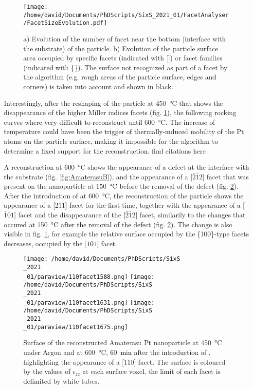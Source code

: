 \begin{figure}[!htb]
    \centering
    \texttt{[image: /home/david/Documents/PhDScripts/SixS\_2021\_01/FacetAnalyser/FacetSizeEvolution.pdf]}
    \caption{
        a) Evolution of the number of facet near the bottom (interface with the substrate) of the particle.
        b) Evolution of the particle surface area occupied by specific facets (indicated with []) or facet families (indicated with \{\}).
        The surface not recognized as part of a facet by the algorithm (e.g. rough areas of the particle surface, edges and corners) is taken into account and shown in black.
    }
    \label{fig:AmaterasuFacetsEvolution}
\end{figure}

Interestingly, after the reshaping of the particle at \qty{450}{\degreeCelsius} that shows the disappearance of the higher Miller indices facets (fig. \ref{fig:AmaterasuFacetsEvolution}), the following rocking curves where very difficult to reconstruct until \qty{600}{\degreeCelsius}.
The increase of temperature could have been the trigger of thermally-induced mobility of the Pt atoms on the particle surface, making it impossible for the algorithm to determine a fixed support for the reconstruction.
\textcolor{Important}{find citations here}

A reconstruction at \qty{600}{\degreeCelsius} shows the appearance of a defect at the interface with the substrate (fig. \ref{fig:AmaterasuB}), and the appearance of a [$\bar{2}\bar{1}2$] facet that was present on the nanoparticle at \qty{150}{\degreeCelsius} before the removal of the defect (fig. \ref{fig:Amaterasu110}).
After the introduction of \ammonia at \qty{600}{\degreeCelsius}, the reconstruction of the particle shows the appearance of a [2$\bar{1}\bar{1}$] facet for the first time, together with the appearance of a [$\bar{1}01$] facet and the disappearance of the [$\bar{2}\bar{1}2$] facet, similarily to the changes that occured at \qty{150}{\degreeCelsius} after the removal of the defect (fig. \ref{fig:Amaterasu110}).
The change is also visible in fig. \ref{fig:AmaterasuFacetsEvolution}, for example the relative surface occupied by the \{100\}-type facets decreases, occupied by the [$\bar{1}01$] facet.

\begin{figure}[!htb]
    \centering
    \texttt{[image: /home/david/Documents/PhDScripts/SixS\\\_2021\\\_01/paraview/110facet1588.png]}
    \texttt{[image: /home/david/Documents/PhDScripts/SixS\\\_2021\\\_01/paraview/110facet1631.png]}
    \texttt{[image: /home/david/Documents/PhDScripts/SixS\\\_2021\\\_01/paraview/110facet1675.png]}
    \caption{
        Surface of the reconstructed Amaterasu Pt nanoparticle at \qty{450}{\degreeCelsius} under Argon and at \qty{600}{\degreeCelsius}, \qty{60}{\minute} after the introduction of \ammonia, highlighting the appearance of a [110] facet.
        The surface is coloured by the values of $\epsilon_{zz}$ at each surface voxel, the limit of each facet is delimited by white tubes.
    }
    \label{fig:Amaterasu110}
\end{figure}

